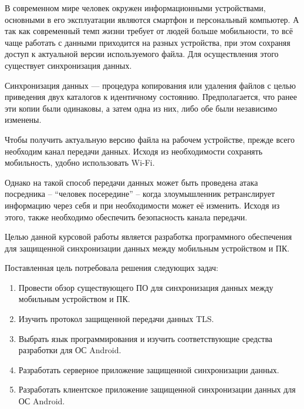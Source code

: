 
В современном мире человек окружен информационными устройствами, основными в его эксплуатации являются смартфон и персональный компьютер. А так как современный темп жизни требует от людей больше мобильности, то всё чаще работать с данными приходится на разных устройства, при этом сохраняя доступ к актуальной версии используемого файла. Для осуществления этого существует синхронизация данных.

Синхронизация данных — процедура копирования или удаления файлов с целью приведения двух каталогов к идентичному состоянию. Предполагается, что ранее эти копии были одинаковы, а затем одна из них, либо обе были независимо изменены.

Чтобы получить актуальную версию файла на рабочем устройстве, прежде всего необходим канал передачи данных. Исходя из необходимости сохранять мобильность, удобно использовать Wi-Fi.

Однако на такой способ передачи данных может быть проведена атака посредника – ``человек посередине'' – когда злоумышленник ретранслирует информацию через себя и при необходимости может её изменить. Исходя из этого, также необходимо обеспечить безопасность канала передачи.

Целью данной курсовой работы является разработка программного обеспечения для защищенной синхронизации данных между мобильным устройством и ПК.

Поставленная цель потребовала решения следующих задач:

\begin{enumerate}
\item Провести обзор существующего ПО для синхронизация данных между мобильным устройством и ПК.
\item Изучить протокол защищенной передачи данных TLS.
\item Выбрать язык программирования и изучить соответствующие средства разработки для ОС Android.
\item Разработать серверное приложение защищенной синхронизации данных.
\item Разработать клиентское приложение защищенной синхронизации данных для ОС Android.
\end{enumerate}